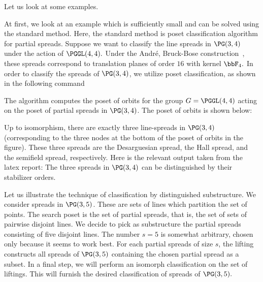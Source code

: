 \bigskip

Let us look at some examples. 



\bigskip

At first, we look at an example which is sufficiently small and can be 
solved using the standard method. 
Here, the standard method is poset classification algorithm for partial spreads.
Suppose we want to classify the line spreads in $\PG(3,4)$ under the action of $\PGGL(4,4).$ 
Under the Andr\'e, Bruck-Bose construction~\cite{Andre54,BruckBose64}, 
these spreads correspond to translation planes of order $16$ with kernel $\bbF_4.$
In order to classify the spreads of $\PG(3,4)$, we utilize poset classification, 
as shown in the following command


The algorithm computes the poset of orbits for the group $G =\PGGL(4,4)$ acting on 
the poset of partial spreads in $\PG(3,4)$. 
The poset of orbits is shown below:


Up to isomorphism, there are exactly 
three line-spreads in $\PG(3,4)$ (corresponding 
to the three nodes at the bottom of the poset of orbits in the figure). 
These three spreads are the Desarguesian spread, 
the Hall spread, and the semifield spread, respectively. 
Here is the relevant output taken from the latex report:
The three spreads in $\PG(3,4)$ can be distinguished by their stabilizer orders.



%

\bigskip






Let us illustrate the technique of classification by distinguished substructure.
We consider spreads in $\PG(3,5)$. 
These are sets of lines which partition the set of points. 
The search poset is the set of partial spreads, 
that is, the set of sets of pairwise disjoint lines. 
We decide to pick as substructure the partial spreads consisting of five disjoint lines. 
The number $s=5$ is somewhat arbitrary, chosen only because it seems to work best. 
For each partial spreads of size $s$, the 
lifting constructs all spreads of $\PG(3,5)$ 
containing the chosen partial spread as a subset. 
In a final step, we will perform an isomorph classification on the set of liftings. 
This will furnish the desired classification of spreads of $\PG(3,5).$


